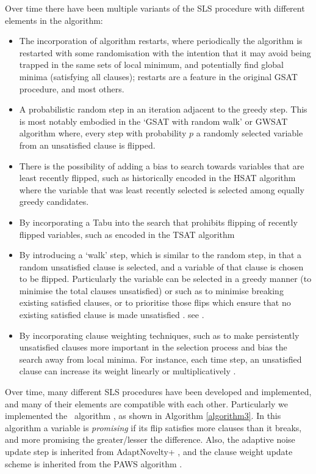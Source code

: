 \documentclass[
10pt, %
a4paper, %
oneside, %
headinclude,footinclude, %
BCOR5mm, %
]{scrartcl}
\begin{document}
Over time there have been multiple variants of the SLS procedure with different elements in the algorithm:
\begin{itemize}
\item	The incorporation of algorithm restarts, where periodically the algorithm is restarted with some randomisation with the intention that it may avoid being trapped in the same sets of local minimum, and potentially find global minima (satisfying all clauses); restarts are a feature in the original GSAT procedure, and most others.
\item	A probabilistic random step in an iteration adjacent to the greedy step. This is most notably embodied in the `GSAT with random walk' or GWSAT algorithm \cite{DBLP:conf/aaai/SelmanKC94} where, every step with probability $p$ a randomly selected variable from an unsatisfied clause is flipped.
\item	There is the possibility of adding a bias to search towards variables that are least recently flipped, such as historically encoded in the HSAT algorithm \cite{Gent:93AA} where the variable that was least recently selected is selected among equally greedy candidates.
\item	By incorporating a Tabu into the search that prohibits flipping of recently flipped variables, such as encoded in the TSAT algorithm \cite{DBLP:conf/aaai/MazureSG97}
\item	By introducing a `walk' step, which is similar to the random step, in that a random unsatisfied clause is selected, and a variable of that clause is chosen to be flipped.
Particularly the  variable can be selected in a greedy manner (to minimise the total clauses unsatisfied) or such as to minimise breaking existing satisfied clauses, or to prioritise those flips which ensure that no existing satisfied clause is made unsatisfied \cite{DBLP:conf/aaai/SelmanKC94}. see \cite{DBLP:conf/aaai/McAllesterSK97}.
\item	By incorporating clause weighting techniques, such as to make persistently unsatisfied clauses more important in the selection process and bias the search away from local minima. 
For instance, each time step, an unsatisfied clause can increase its weight linearly or multiplicatively \cite{DBLP:conf/aaai/ThorntonPBF04}.
\end{itemize}

Over time, many different SLS procedures have been developed and implemented, and many of their elements are compatible with each other.
Particularly we implemented the \gnoveltyp\ algorithm \cite{DBLP:journals/jsat/PhamTGS08}, as shown in Algorithm \ref{algorithm3}.
In this algorithm a variable is \textit{promising} if its flip satisfies more clauses than it breaks, and more promising the greater/lesser the difference.
Also, the adaptive noise update step is inherited from AdaptNovelty+ \cite{DBLP:conf/aaai/Hoos02}, and the clause weight update scheme is inherited from the PAWS algorithm \cite{DBLP:conf/aaai/ThorntonPBF04}.
\end{document}
